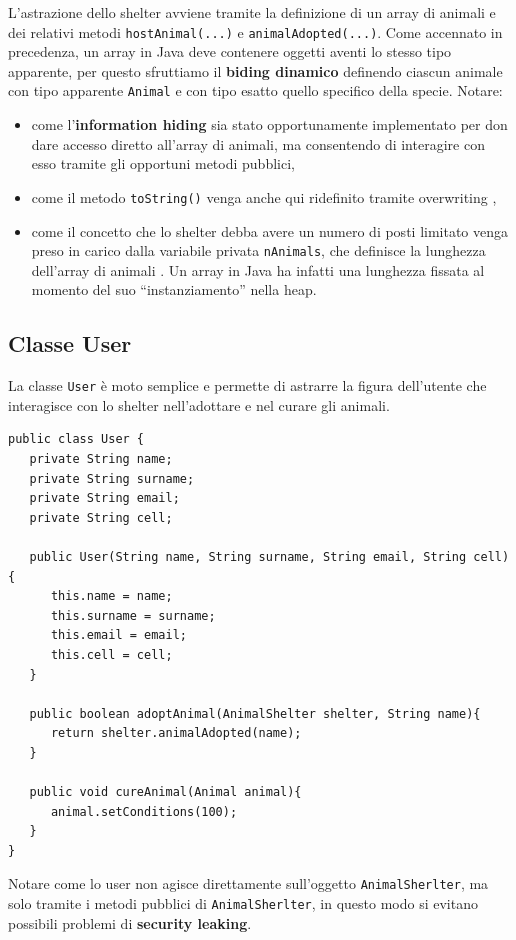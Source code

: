 \documentclass[a4paper,11pt]{article}
\begin{document}
L'astrazione dello shelter avviene tramite la definizione di un array di animali e dei relativi metodi {\tt hostAnimal(...)} e {\tt animalAdopted(...)}. Come accennato in precedenza, un array in Java deve contenere oggetti aventi lo stesso tipo apparente, per questo sfruttiamo il \textbf{biding dinamico} definendo ciascun animale con tipo apparente {\tt Animal} e con tipo esatto quello specifico della specie.
Notare:
\begin{itemize}
    \item come l'\textbf{information hiding} sia stato opportunamente implementato per don dare accesso diretto all'array di animali, ma consentendo di interagire con esso tramite gli opportuni metodi pubblici\cite{java},
    \item come il metodo {\tt toString()} venga anche qui ridefinito tramite overwriting \cite{java},
    \item come il concetto che lo shelter debba avere un numero di posti limitato venga preso in carico dalla variabile privata {\tt nAnimals}, che definisce la lunghezza dell'array di animali \cite{java_book}. Un array in Java ha infatti una lunghezza fissata al momento del suo ``instanziamento'' nella heap.
\end{itemize}


\subsection{Classe User}

La classe {\tt User} è moto semplice e permette di astrarre la figura dell'utente che interagisce con lo shelter nell'adottare e nel curare gli animali.

\begin{lstlisting}[caption={AnimalShelter.java}]
public class User {
   private String name;
   private String surname;
   private String email;
   private String cell;

   public User(String name, String surname, String email, String cell){
      this.name = name;
      this.surname = surname;
      this.email = email;
      this.cell = cell;
   }

   public boolean adoptAnimal(AnimalShelter shelter, String name){
      return shelter.animalAdopted(name);
   }

   public void cureAnimal(Animal animal){
      animal.setConditions(100);
   }
}
\end{lstlisting}

Notare come lo user non agisce direttamente sull'oggetto {\tt AnimalSherlter}, ma solo tramite i metodi pubblici di {\tt AnimalSherlter}, in questo modo si evitano possibili problemi di \textbf{security leaking}.
\end{document}
